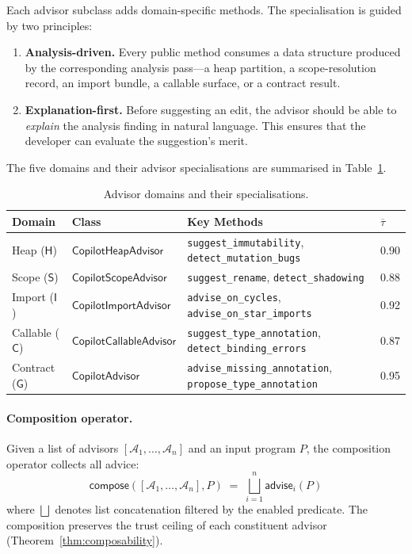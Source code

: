 \documentclass[11pt]{article}
\newcommand{\Adv}{\mathcal{A}}
\newcommand{\Trust}{\tau}
\newcommand{\TrustCeil}{\overline{\Trust}}
\newcommand{\AdvisorOp}{\mathsf{advise}}
\newcommand{\ComposeOp}{\mathsf{compose}}
\begin{document}
Each advisor subclass adds domain-specific methods.  The specialisation
is guided by two principles:

\begin{enumerate}
  \item \textbf{Analysis-driven.}  Every public method consumes a
    data structure produced by the corresponding analysis pass—a heap
    partition, a scope-resolution record, an import bundle, a callable
    surface, or a contract result.
  \item \textbf{Explanation-first.}  Before suggesting an edit, the
    advisor should be able to \emph{explain} the analysis finding in
    natural language.  This ensures that the developer can evaluate
    the suggestion's merit.
\end{enumerate}

The five domains and their advisor specialisations are summarised in
Table~\ref{tab:domains}.

\begin{table}[ht]
\centering
\caption{Advisor domains and their specialisations.}
\label{tab:domains}
\begin{tabular}{@{}llll@{}}
\toprule
\textbf{Domain} & \textbf{Class} & \textbf{Key Methods} & $\TrustCeil$ \\
\midrule
Heap ($\mathsf{H}$)
  & $\mathsf{CopilotHeapAdvisor}$
  & \texttt{suggest\_immutability}, \texttt{detect\_mutation\_bugs}
  & 0.90 \\
Scope ($\mathsf{S}$)
  & $\mathsf{CopilotScopeAdvisor}$
  & \texttt{suggest\_rename}, \texttt{detect\_shadowing}
  & 0.88 \\
Import ($\mathsf{I}$)
  & $\mathsf{CopilotImportAdvisor}$
  & \texttt{advise\_on\_cycles}, \texttt{advise\_on\_star\_imports}
  & 0.92 \\
Callable ($\mathsf{C}$)
  & $\mathsf{CopilotCallableAdvisor}$
  & \texttt{suggest\_type\_annotation}, \texttt{detect\_binding\_errors}
  & 0.87 \\
Contract ($\mathsf{G}$)
  & $\mathsf{CopilotAdvisor}$
  & \texttt{advise\_missing\_annotation}, \texttt{propose\_type\_annotation}
  & 0.95 \\
\bottomrule
\end{tabular}
\end{table}

\paragraph{Composition operator.}
Given a list of advisors $[\Adv_1, \ldots, \Adv_n]$ and an input
program $P$, the composition operator collects all advice:
\[
  \ComposeOp([\Adv_1, \ldots, \Adv_n], P)
  \;=\;
  \bigsqcup_{i=1}^{n} \AdvisorOp_i(P)
\]
where $\bigsqcup$ denotes list concatenation filtered by the enabled
predicate.  The composition preserves the trust ceiling of each
constituent advisor (Theorem~\ref{thm:composability}).
\end{document}
